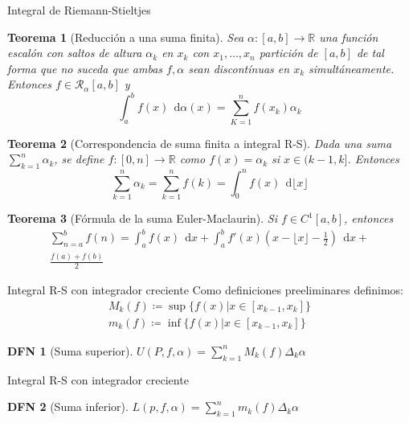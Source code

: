 \documentclass[a4paper]{article}\usepackage{/home/alonso/Documents/Projects/formularios/styles}
\newtheorem{definition}{DFN}
\theoremstyle{mytheoremstyle}
\newtheorem{theorem}{Teorema}
\newcommand{\R}{\mathbb{R}}
\newcommand{\1}{\mathds{1}}
\newcommand{\diff}[1]{\,\mathrm{d}#1}
\begin{document}
\begin{multicols*}{3}
\begin{roundbox}{Integral de Riemann-Stieltjes}
	\begin{theorem}[Reducción a una suma finita]
		Sea $ \alpha : [a,b] \to \R $ una función escalón con saltos de altura $ \alpha_k $ en $ x_k $ con $ x_1, \ldots, x_n$ partición de $ [a,b] $ de tal forma que no suceda que ambas $ f, \alpha $ sean discontínuas en $ x_k $ simultáneamente.
		Entonces $  f \in \mathcal{R}_{\alpha}[a,b] $ y
		\[
			\int_{a}^{b} f(x) \; \diff{\alpha(x)} = \sum_{K=1}^{n} f(x_k) \alpha_k
		\]
	\end{theorem}

	\begin{theorem}[Correspondencia de suma finita a integral R-S]
		Dada una suma $ \sum_{k=1}^{n} \alpha_k  $, se define $ f : [0,n] \to \R  $ como $ f(x) = \alpha_k $ si $ x \in (k-1, k] $.
		Entonces
		\[
			\sum_{k=1}^{n} \alpha_k = \sum_{k=1}^{n} f(k) = \int_{0}^{n} f(x) \; \diff{\lfloor x \rfloor}
		\]
	\end{theorem}

	\begin{theorem}[Fórmula de la suma Euler-Maclaurin]
		Si $ f \in C^{1}[a,b] $, entonces
		\[
			\begin{split}
			\sum_{n=a}^{b} f(n) = \int_{a}^{b} f(x) \; \diff{x} + \int_{a}^{b} f'(x) \left(x - \lfloor x \rfloor - \frac{1}{2} \right) \; \diff{x} + \\ \frac{f(a) + f(b)}{2}
			\end{split}
		\]
	\end{theorem}
\end{roundbox}

\begin{roundbox}{Integral R-S con integrador creciente}
	Como definiciones preeliminares definimos:
\begin{align*}
	M_k (f) \coloneqq \sup \{ f(x) | x \in [x_{k-1}, x_k] \} \\
	m_k (f) \coloneqq \inf \{ f(x) | x \in [x_{k-1}, x_k] \}
 \end{align*}

\begin{definition}[Suma superior]
	$ \displaystyle U(P, f, \alpha) = \sum_{k=1}^{n} M_k (f) \Delta_k \alpha $
\end{definition}
\end{roundbox}

\begin{roundbox}{Integral R-S con integrador creciente}
	\begin{definition}[Suma inferior]
		$ \displaystyle L(p,f,\alpha) = \sum_{k=1}^{n} m_k (f) \Delta_k \alpha $
	\end{definition}


\end{roundbox}
\end{multicols*}
\end{document}
